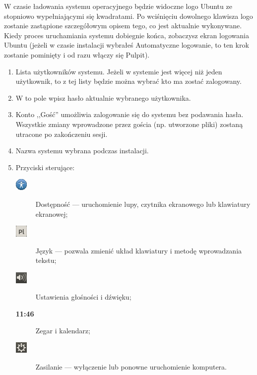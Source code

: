 W czasie ładowania systemu operacyjnego będzie widoczne logo Ubuntu ze stopniowo wypełniającymi się kwadratami. Po wciśnięciu dowolnego klawisza logo zostanie zastąpione szczegółowym opisem tego, co jest aktualnie wykonywane.
Kiedy proces uruchamiania systemu dobiegnie końca, zobaczysz ekran logowania Ubuntu (jeżeli w czasie instalacji wybrałeś \textcolor{ubuntu_orange}{Automatyczne logowanie}, to ten krok zostanie pominięty i od razu włączy się Pulpit).
\begin{enumerate}[label=\protect\circled{\arabic*}]
\item Lista użytkowników systemu. Jeżeli w systemie jest więcej niż jeden użytkownik, to z tej listy będzie można wybrać kto ma zostać zalogowany.
\item W to pole wpisz hasło aktualnie wybranego użytkownika.
\item Konto ,,Gość'' umożliwia zalogowanie się do systemu bez podawania hasła. Wszystkie zmiany wprowadzone przez gościa (np. utworzone pliki) zostaną utracone po zakończeniu sesji.
\item Nazwa systemu wybrana podczas instalacji.
\item Przyciski sterujące:
\begin{description}
\item[\includegraphics{images/ikony_dostempnosc.png}] \textcolor{ubuntu_orange}{Dostępność} --- uruchomienie lupy, czytnika ekranowego lub klawiatury ekranowej;
\item[\includegraphics{images/ikony_jezyk.png}] \textcolor{ubuntu_orange}{Język} --- pozwala zmienić układ klawiatury i metodę wprowadzania tekstu;
\item[\includegraphics{images/ikony_dzwiek.png}] \textcolor{ubuntu_orange}{Ustawienia głośności i dźwięku};
\item[\textbf{11:46}] \textcolor{ubuntu_orange}{Zegar i kalendarz};
\item[\includegraphics{images/ikony_zasilanie.png}] \textcolor{ubuntu_orange}{Zasilanie} --- wyłączenie lub ponowne uruchomienie komputera.
\end{description}
\end{enumerate}
